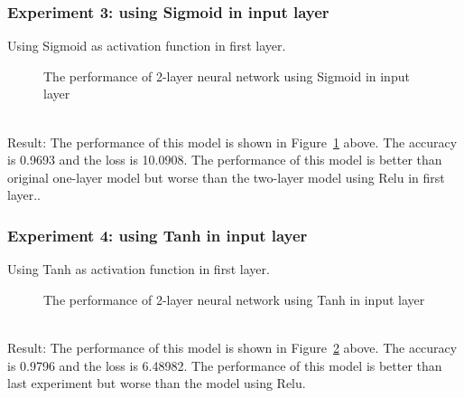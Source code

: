 \documentclass[]{UCD_CS_FYP_Report}
\begin{document}
\subsubsection{Experiment 3: using Sigmoid in input layer}
Using Sigmoid as activation function in first layer.
\begin{figure}[h]
\centering
\fboxsep 2mm
\caption{\label{fig:MNIST_fully_connected_S2E3} The performance of 2-layer neural network using Sigmoid in input layer}
\end{figure}
\\Result: The performance of this model is shown in Figure~\ref{fig:MNIST_fully_connected_S2E3} above. The accuracy is 0.9693 and the loss is 10.0908. The performance of this model is better than original one-layer model but worse than the two-layer model using Relu in first layer.. 
%
\subsubsection{Experiment 4: using Tanh in input layer}
Using Tanh as activation function in first layer.
\begin{figure}[h]
\centering
\fboxsep 2mm
\caption{\label{fig:MNIST_fully_connected_S2E4} The performance of 2-layer neural network using Tanh in input layer}
\end{figure}
\\Result: The performance of this model is shown in Figure~\ref{fig:MNIST_fully_connected_S2E4} above. The  accuracy is 0.9796 and the loss is 6.48982. The performance of this model is better than last experiment but worse than the model using Relu.
%
\end{document}
